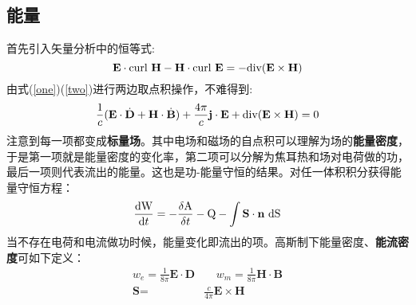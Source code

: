\documentclass[12pt]{ctexart}%
\begin{document}
\subsection*{能量}
首先引入矢量分析中的恒等式:
\begin{equation}
    \textbf{E}\cdot\textup{curl }\textbf{H}-\textbf{H}\cdot\textup{curl }\textbf{E} = -\textup{div}(\textbf{E}\times\textbf{H})
\end{equation}
由式(\ref{one})(\ref{two})进行两边取点积操作，不难得到:
\begin{equation}
    \frac{1}{c}(\textbf{E}\cdot\dot{\textbf{D}}+\textbf{H}\cdot\dot{\textbf{B}}) + \frac{4\pi}{c}\textbf{j}\cdot\textbf{E} + \textup{div}(\textbf{E}\times\textbf{H})= 0
\end{equation}
注意到每一项都变成\textbf{标量场}。其中电场和磁场的自点积可以理解为场的\textbf{能量密度}，于是第一项就是能量密度的变化率，第二项可以分解为焦耳热和场对电荷做的功，最后一项则代表流出的能量。这也是功-能量守恒的结果。对任一体积积分获得能量守恒方程：
\begin{equation}
    \frac{\mathrm{d}\textup{W}}{\mathrm{d}t}=-\frac{\delta \textup{A}}{\delta t}-\textup{Q}-\int \textbf{S}\cdot\textbf{n}\textup{ dS}
\end{equation}
当不存在电荷和电流做功时候，能量变化即流出的项。高斯制下能量密度、\textbf{能流密度}可如下定义：
\begin{align}
    w_e =\frac{1}{8\pi}\textbf{E}\cdot \textbf{D} & \ \ \ \ \
    w_m =\frac{1}{8\pi}\textbf{H}\cdot\textbf{B} \\
    \textbf{S}= & \frac{c}{4\pi}\textbf{E}\times\textbf{H}
\end{align}
\end{document}
